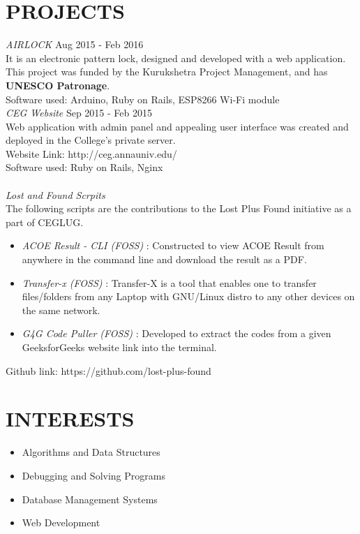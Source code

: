 \documentclass[margin, 10pt]{res} %
\begin{document}
\begin{resume}
 
\section{PROJECTS}

{\sl AIRLOCK} \hfill Aug 2015 - Feb 2016 \\
It is an electronic pattern lock, designed and developed with a web application. This project was funded by the Kurukshetra Project Management, and has \textbf{UNESCO Patronage}.\\ 
Software used: Arduino, Ruby on Rails, ESP8266 Wi-Fi module \\

{\sl CEG Website} \hfill Sep 2015 - Feb 2015 \\
Web application with admin panel and appealing user interface was created and deployed in the College's private server. \\
Website Link: http://ceg.annauniv.edu/ \\
Software used: Ruby on Rails, Nginx \\
\\
{\sl Lost and Found Scrpits }  \\
The following scripts are the contributions to the Lost Plus Found initiative as a part of  CEGLUG. \\
\begin{itemize}
\item{\sl ACOE Result - CLI (FOSS)} : 
Constructed to view ACOE Result from anywhere in the command line and download the result as a PDF.
\item{\sl Transfer-x (FOSS)} : 
Transfer-X is a tool that enables one to transfer files/folders from any Laptop with GNU/Linux distro to any other devices on the same network.
\item{\sl G4G Code Puller (FOSS)} : 
Developed to extract the codes from a given GeeksforGeeks website link into the terminal.\\
\end{itemize}
Github link: https://github.com/lost-plus-found
\section{INTERESTS} 
\begin{itemize}
\item Algorithms and Data Structures
\item Debugging and Solving Programs
\item Database Management Systems
\item Web Development
\end{itemize}





\end{resume}
\end{document}
